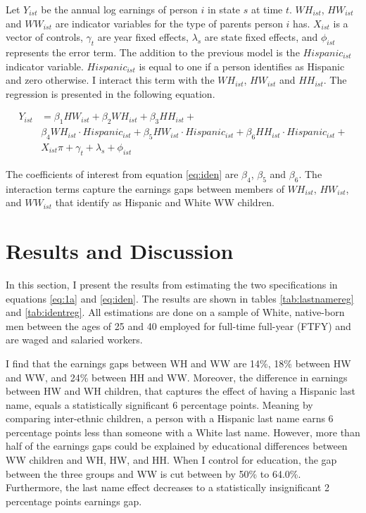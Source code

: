 \documentclass{wptemp}
\begin{document}
Let $Y_{ist}$ be the annual log earnings of person $i$ in state $s$ at time $t$. $WH_{ist}$, $HW_{ist}$ and $WW_{ist}$ are indicator variables for the type of parents person $i$ has. $X_{ist}$ is a vector of controls, $\gamma_{t}$ are year fixed effects, $\lambda_s$ are state fixed effects, and $\phi_{ist}$ represents the error term. The addition to the previous model is the $Hispanic_{ist}$ indicator variable. $Hispanic_{ist}$ is equal to one if a person identifies as Hispanic and zero otherwise. I interact this term with the $WH_{ist}$, $HW_{ist}$ and $HH_{ist}$.  The regression is presented in the following equation.

\begin{align} \label{eq:iden}
Y_{ist} &= \beta_{1} HW_{ist} +  \beta_{2} WH_{ist} + \beta_{3} HH_{ist} +\\
& \beta_{4} WH_{ist} \cdot Hispanic_{ist} + \beta_{5} HW_{ist}\cdot Hispanic_{ist} +  \beta_{6} HH_{ist} \cdot Hispanic_{ist}+ \nonumber \\
&X_{ist} \pi + \gamma_{t} + \lambda_s + \phi_{ist} \nonumber
\end{align}

The coefficients of interest from equation \ref{eq:iden} are $\beta_{4}$, $\beta_{5}$ and $\beta_{6}$. The interaction terms capture the earnings gaps between members of $WH_{ist}$, $HW_{ist}$, and $WW_{ist}$ that identify as Hispanic and White WW children. 

\section{Results and Discussion}\label{sec:results}

In this section, I present the results from estimating the two specifications in equations \ref{eq:1a} and \ref{eq:iden}. The results are shown in tables \ref{tab:lastnamereg} and \ref{tab:identreg}. All estimations are done on a sample of White, native-born men between the ages of 25 and 40 employed for full-time full-year (FTFY) and are waged and salaried workers.

I find that the earnings gaps between WH and WW are 14\%, 18\% between HW and WW, and 24\% between HH and WW. Moreover, the difference in earnings between HW and WH children, that captures the effect of having a Hispanic last name, equals a statistically significant 6 percentage points. Meaning by comparing inter-ethnic children, a person with a Hispanic last name earns 6 percentage points less than someone with a White last name. However, more than half of the earnings gaps could be explained by educational differences between WW children and WH, HW, and HH. When I control for education, the gap between the three groups and WW is cut between by 50\% to 64.0\%. Furthermore, the last name effect decreases to a statistically insignificant 2 percentage points earnings gap.
\end{document}
